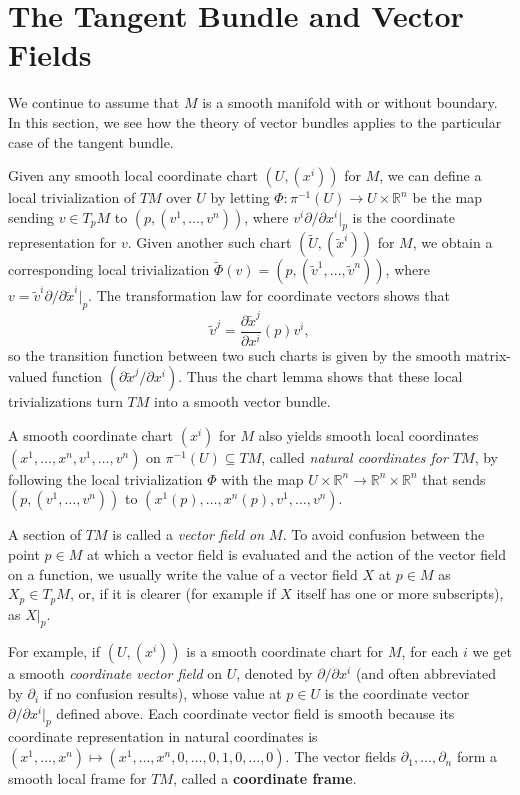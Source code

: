 \section{The Tangent Bundle and Vector Fields}

We continue to assume that $M$ is a smooth manifold with or without boundary. In this section, we see how the theory of vector bundles applies to the particular case of the tangent bundle.

Given any smooth local coordinate chart $(U, (x^i))$ for $M$, we can define a local trivialization of $TM$ over $U$ by letting $\Phi: \pi^{-1}(U) \to U \times \mathbb{R}^n$ be the map sending $v \in T_pM$ to $(p, (v^1, \ldots, v^n))$, where $v^i\partial/\partial x^i|_p$ is the coordinate representation for $v$. Given another such chart $(\tilde{U}, (\tilde{x}^i))$ for $M$, we obtain a corresponding local trivialization $\tilde{\Phi}(v) = (p, (\tilde{v}^1, \ldots, \tilde{v}^n))$, where $v = \tilde{v}^i \partial/\partial \tilde{x}^i|_p$. The transformation law for coordinate vectors shows that
\[
\tilde{v}^j = \frac{\partial \tilde{x}^j}{\partial x^i}(p)v^i,
\]
so the transition function between two such charts is given by the smooth matrix-valued function $(\partial \tilde{x}^j/\partial x^i)$. Thus the chart lemma shows that these local trivializations turn $TM$ into a smooth vector bundle.

A smooth coordinate chart $(x^i)$ for $M$ also yields smooth local coordinates $(x^1,\ldots,x^n, v^1, \ldots, v^n)$ on $\pi^{-1}(U) \subseteq TM$, called \emph{natural coordinates for $TM$}, by following the local trivialization $\Phi$ with the map $U \times \mathbb{R}^n \to \mathbb{R}^n \times \mathbb{R}^n$ that sends $(p, (v^1, \ldots, v^n))$ to $(x^1(p), \ldots, x^n(p), v^1, \ldots, v^n)$.

A section of $TM$ is called a \emph{vector field on $M$}. To avoid confusion between the point $p \in M$ at which a vector field is evaluated and the action of the vector field on a function, we usually write the value of a vector field $X$ at $p \in M$ as $X_p \in T_pM$, or, if it is clearer (for example if $X$ itself has one or more subscripts), as $X|_p$.

For example, if $(U, (x^i))$ is a smooth coordinate chart for $M$, for each $i$ we get a smooth \emph{coordinate vector field} on $U$, denoted by $\partial/\partial x^i$ (and often abbreviated by $\partial_i$ if no confusion results), whose value at $p \in U$ is the coordinate vector $\partial/\partial x^i|_p$ defined above. Each coordinate vector field is smooth because its coordinate representation in natural coordinates is $(x^1, \ldots, x^n) \mapsto (x^1, \ldots, x^n, 0, \ldots, 0, 1, 0, \ldots, 0)$. The vector fields $\partial_1, \ldots, \partial_n$ form a smooth local frame for $TM$, called a \textbf{coordinate frame}.


